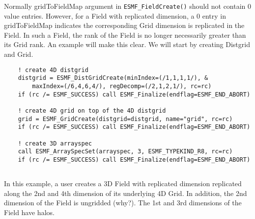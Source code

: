     Normally gridToFieldMap argument in {\tt ESMF\_FieldCreate()} should not contain
    0 value entries. However, for a Field with replicated dimension, a 0 entry in gridToFieldMap
    indicates the corresponding Grid dimension is replicated in the Field. In such a Field,
    the rank of the Field is no longer necessarily greater than its Grid rank.
    An example will make this clear. We will start by creating Distgrid and Grid.
   

 \begin{verbatim}
    ! create 4D distgrid
    distgrid = ESMF_DistGridCreate(minIndex=(/1,1,1,1/), &
        maxIndex=(/6,4,6,4/), regDecomp=(/2,1,2,1/), rc=rc)
    if (rc /= ESMF_SUCCESS) call ESMF_Finalize(endflag=ESMF_END_ABORT)

    ! create 4D grid on top of the 4D distgrid
    grid = ESMF_GridCreate(distgrid=distgrid, name="grid", rc=rc)
    if (rc /= ESMF_SUCCESS) call ESMF_Finalize(endflag=ESMF_END_ABORT)

    ! create 3D arrayspec
    call ESMF_ArraySpecSet(arrayspec, 3, ESMF_TYPEKIND_R8, rc=rc)
    if (rc /= ESMF_SUCCESS) call ESMF_Finalize(endflag=ESMF_END_ABORT)
 
\end{verbatim}
 

   In this example, a user creates a 3D Field with replicated dimension
   replicated along the 2nd and 4th dimension of its underlying 4D Grid.
   In addition, the 2nd dimension of the Field is ungridded (why?). The 1st and
   3rd dimensions of the Field have halos. 

